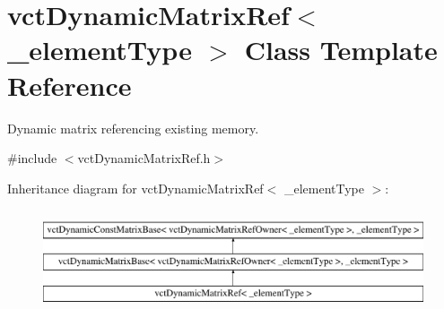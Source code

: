 \hypertarget{classvct_dynamic_matrix_ref}{}\section{vct\+Dynamic\+Matrix\+Ref$<$ \+\_\+element\+Type $>$ Class Template Reference}
\label{classvct_dynamic_matrix_ref}


Dynamic matrix referencing existing memory.  




{\ttfamily \#include $<$vct\+Dynamic\+Matrix\+Ref.\+h$>$}

Inheritance diagram for vct\+Dynamic\+Matrix\+Ref$<$ \+\_\+element\+Type $>$\+:\begin{figure}[H]
\begin{center}
\leavevmode
\includegraphics[height=3.000000cm]{d6/dbd/classvct_dynamic_matrix_ref}
\end{center}
\end{figure}
